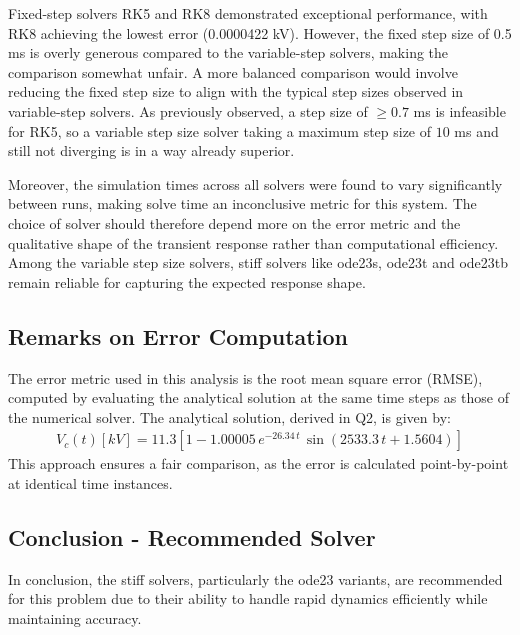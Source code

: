 Fixed-step solvers RK5 and RK8 demonstrated exceptional performance, with RK8 achieving the lowest error (0.0000422 kV). However, the fixed step size of 0.5 ms is overly generous compared to the variable-step solvers, making the comparison somewhat unfair. A more balanced comparison would involve reducing the fixed step size to align with the typical step sizes observed in variable-step solvers. As previously observed, a step size of $\geq 0.7$ ms is infeasible for RK5, so a variable step size solver taking a maximum step size of $10$ ms and still not diverging is in a way already superior.

Moreover, the simulation times across all solvers were found to vary significantly between runs, making solve time an inconclusive metric for this system. The choice of solver should therefore depend more on the error metric and the qualitative shape of the transient response rather than computational efficiency. Among the variable step size solvers, stiff solvers like ode23s, ode23t and ode23tb remain reliable for capturing the expected response shape.

\subsection*{Remarks on Error Computation}
The error metric used in this analysis is the root mean square error (RMSE), computed by evaluating the analytical solution at the same time steps as those of the numerical solver. The analytical solution, derived in Q2, is given by:
\begin{align*}
    V_{c}(t) [kV] = 11.3 \left[1 - 1.00005 \, e^{-26.34\, t} \, \sin(2533.3\, t + 1.5604)\right]
\end{align*}
This approach ensures a fair comparison, as the error is calculated point-by-point at identical time instances.

\subsection*{Conclusion - Recommended Solver}   

In conclusion, the stiff solvers, particularly the ode23 variants, are recommended for this problem due to their ability to handle rapid dynamics efficiently while maintaining accuracy.
